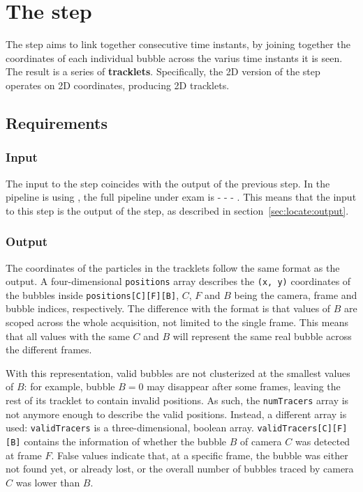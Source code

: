 \chapter{The \linkDD* step}
\label{chap:2dlink}

The \link* step aims to link together consecutive time instants, by joining together the coordinates of each individual bubble across the varius time instants it is seen.
The result is a series of \textbf{tracklets}.
Specifically, the 2D version of the \link* step operates on 2D coordinates, producing 2D tracklets.

\section{Requirements}

\subsection{Input}

The input to the \link* step coincides with the output of the previous step.
In the pipeline is using \linkDD*, the full pipeline under exam is \locate* - \link* - \match* - \visual*.
This means that the input to this step is the output of the \locate* step, as described in section~\ref{sec:locate:output}.

\subsection{Output}
\label{sec:linkDD:output}

The coordinates of the particles in the tracklets follow the same format as the \locate* output.
A four-dimensional \texttt{positions} array describes the \texttt{(x, y)} coordinates of the bubbles inside \texttt{positions[C][F][B]}, $C$, $F$ and $B$ being the camera, frame and bubble indices, respectively.
The difference with the \locate* format is that values of $B$ are scoped across the whole acquisition, not limited to the single frame.
This means that all values with the same $C$ and $B$ will represent the same real bubble across the different frames.

With this representation, valid bubbles are not clusterized at the smallest values of $B$: for example, bubble $B{=}0$ may disappear after some frames, leaving the rest of its tracklet to contain invalid positions.
As such, the \texttt{numTracers} array is not anymore enough to describe the valid positions.
Instead, a different array is used: \texttt{validTracers} is a three-dimensional, boolean array.
\texttt{validTracers[C][F][B]} contains the information of whether the bubble $B$ of camera $C$ was detected at frame $F$.
False values indicate that, at a specific frame, the bubble was either not found yet, or already lost, or the overall number of bubbles traced by camera $C$ was lower than $B$.

